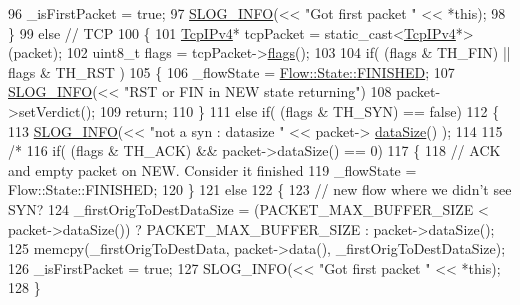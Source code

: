 \begin{DoxyCode}
96             \_isFirstPacket = \textcolor{keyword}{true};
97             \hyperlink{_logger_8h_a119c1c29ba35a8db38e2358e41167282}{SLOG\_INFO}(<< \textcolor{stringliteral}{"Got first packet "} << *\textcolor{keyword}{this});
98         \}
99         \textcolor{keywordflow}{else} \textcolor{comment}{// TCP}
100         \{
101             \hyperlink{class_vsid_common_1_1_tcp_i_pv4}{TcpIPv4}* tcpPacket = \textcolor{keyword}{static\_cast<}\hyperlink{class_vsid_common_1_1_tcp_i_pv4}{TcpIPv4}*\textcolor{keyword}{>}(packet);
102             uint8\_t flags = tcpPacket->\hyperlink{class_vsid_common_1_1_tcp_i_pv4_adb5c52a0772cf3bd53c41702b877b7d1}{flags}();
103 
104             \textcolor{keywordflow}{if}( (flags & TH\_FIN) || flags & TH\_RST )
105             \{
106                 \_flowState = \hyperlink{class_vsid_common_1_1_flow_a4c78d7517903031a861c7287e706a6c2a2c616b2713e2e0aed04b4c4752c88133}{Flow::State::FINISHED};
107                 \hyperlink{_logger_8h_a119c1c29ba35a8db38e2358e41167282}{SLOG\_INFO}(<< \textcolor{stringliteral}{"RST or FIN in NEW state returning"})
108                 packet->setVerdict();
109                 return;
110             \}
111             else if( (flags & TH\_SYN) == false)
112             \{
113                 \hyperlink{_logger_8h_a119c1c29ba35a8db38e2358e41167282}{SLOG\_INFO}(<< \textcolor{stringliteral}{"not a syn : datasize "} << packet->
      \hyperlink{class_vsid_common_1_1_i_pv4_packet_a39fe36210895625ee87320f5c0c7f52e}{dataSize}() );
114                 
115                 \textcolor{comment}{/*}
116 \textcolor{comment}{                if( (flags & TH\_ACK) && packet->dataSize() == 0)}
117 \textcolor{comment}{                \{   }
118 \textcolor{comment}{                    // ACK and empty packet on NEW. Consider it finished}
119 \textcolor{comment}{                    \_flowState = Flow::State::FINISHED;}
120 \textcolor{comment}{                \}}
121 \textcolor{comment}{                else}
122 \textcolor{comment}{                \{}
123 \textcolor{comment}{                    // new flow where we didn't see SYN?}
124 \textcolor{comment}{                    \_firstOrigToDestDataSize = (PACKET\_MAX\_BUFFER\_SIZE < packet->dataSize()) ?
       PACKET\_MAX\_BUFFER\_SIZE : packet->dataSize();}
125 \textcolor{comment}{                    memcpy(\_firstOrigToDestData, packet->data(), \_firstOrigToDestDataSize);}
126 \textcolor{comment}{                    \_isFirstPacket = true;}
127 \textcolor{comment}{                    SLOG\_INFO(<< "Got first packet " << *this);}
128 \textcolor{comment}{                \}}

\end{DoxyCode}

